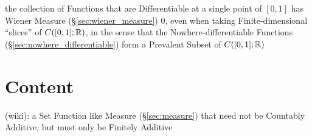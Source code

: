 the collection of Functions that are Differentiable at a single point of
$[0,1]$ has Wiener Measure (\S\ref{sec:wiener_measure}) $0$, even when taking
Finite-dimensional ``slices'' of $C([0,1];\mathbb{R})$, in the sense that the
Nowhere-differentiable Functions (\S\ref{sec:nowhere_differentiable}) form a
Prevalent Subset of $C([0,1]; \mathbb{R})$



\section{Content}\label{sec:content}

(wiki): a Set Function like Measure (\S\ref{sec:measure}) that need not be
Countably Additive, but must only be Finitely Additive
